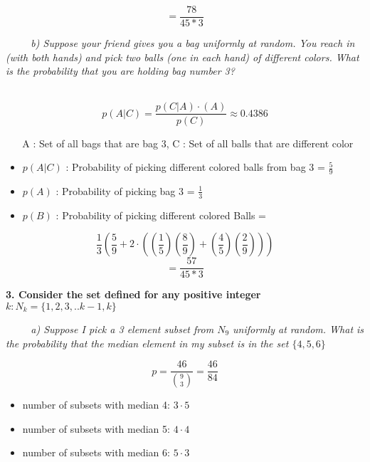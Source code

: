 \documentclass[12pt, letterpaper]{article}
\begin{document}
\[ = \frac{78}{45 * 3}\]


\-\ \newline
\-\ \newline
\-\ \it{ b) Suppose your friend gives you a bag uniformly at random. You reach in (with both hands) and
pick two balls (one in each hand) of different colors. What is the probability that you are holding
bag number 3?  }

\-\ \newline
\[p(A | C) = \frac{p(C | A)\cdotp(A)}{p(C)} \approx 0.4386\]


\-\ \newline
\-\ \newline
A : Set of all bags that are bag 3, 
C : Set of all balls that are different color

\begin{itemize}
    \item \( p(A | C) \) : Probability of picking different colored balls from bag 3 = \(\frac{5}{9}\)
    \item \( p(A) \) : Probability of picking bag 3 = \(\frac{1}{3} \)
    \item \( p(B)\) : Probability of picking different colored Balls =
\end{itemize} 

\[ \frac{1}{3}( \frac{5}{9} + 2 \cdot (\left(\frac{1}{5}\right)\left(\frac{8}{9}\right) + \left(\frac{4}{5}\right)\left(\frac{2}{9}\right))) \]
\[ = \frac{57}{45 * 3}\]


\newpage
\bf{ 3. Consider the set defined for any positive integer \( k: N_k = \{1,2,3,..k-1, k \} \)  }

\-\ \newline
\-\ \newline
\-\ \it{ a) Suppose I pick a 3 element subset from \(N_9\) uniformly at random. What is the probability that
the median element in my subset is in the set \(\{4, 5, 6\}\)  }

\[ p = \frac{46}{{9 \choose 3}} = \frac{46}{84} \]

\begin{itemize}
    \item number of subsets with median 4: \(3\cdot5\)
    \item number of subsets with median 5: \(4\cdot4\)
    \item number of subsets with median 6: \(5\cdot3\)
\end{itemize} 
\end{document}

